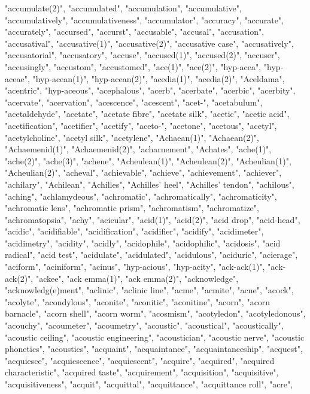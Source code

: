 "accumulate(2)",
"accumulated",
"accumulation",
"accumulative",
"accumulatively",
"accumulativeness",
"accumulator",
"accuracy",
"accurate",
"accurately",
"accursed",
"accurst",
"accusable",
"accusal",
"accusation",
"accusatival",
"accusative(1)",
"accusative(2)",
"accusative case",
"accusatively",
"accusatorial",
"accusatory",
"accuse",
"accused(1)",
"accused(2)",
"accuser",
"accusingly",
"accustom",
"accustomed",
"ace(1)",
"ace(2)",
"hyp-acea",
"hyp-aceae",
"hyp-acean(1)",
"hyp-acean(2)",
"acedia(1)",
"acedia(2)",
"Aceldama",
"acentric",
"hyp-aceous",
"acephalous",
"acerb",
"acerbate",
"acerbic",
"acerbity",
"acervate",
"acervation",
"acescence",
"acescent",
"acet-",
"acetabulum",
"acetaldehyde",
"acetate",
"acetate fibre",
"acetate silk",
"acetic",
"acetic acid",
"acetification",
"acetifier",
"acetify",
"aceto-",
"acetone",
"acetous",
"acetyl",
"acetylcholine",
"acetyl silk",
"acetylene",
"Achaean(1)",
"Achaean(2)",
"Achaemenid(1)",
"Achaemenid(2)",
"acharnement",
"Achates",
"ache(1)",
"ache(2)",
"ache(3)",
"achene",
"Acheulean(1)",
"Acheulean(2)",
"Acheulian(1)",
"Acheulian(2)",
"acheval",
"achievable",
"achieve",
"achievement",
"achiever",
"achilary",
"Achilean",
"Achilles",
"Achilles' heel",
"Achilles' tendon",
"achilous",
"aching",
"achlamydeous",
"achromatic",
"achromatically",
"achromaticity",
"achromatic lens",
"achromatic prism",
"achromatism",
"achromatize",
"achromatopsia",
"achy",
"acicular",
"acid(1)",
"acid(2)",
"acid drop",
"acid-head",
"acidic",
"acidifiable",
"acidification",
"acidifier",
"acidify",
"acidimeter",
"acidimetry",
"acidity",
"acidly",
"acidophile",
"acidophilic",
"acidosis",
"acid radical",
"acid test",
"acidulate",
"acidulated",
"acidulous",
"aciduric",
"acierage",
"aciform",
"aciniform",
"acinus",
"hyp-acious",
"hyp-acity",
"ack-ack(1)",
"ack-ack(2)",
"ackee",
"ack emma(1)",
"ack emma(2)",
"acknowledge",
"acknowledg(e)ment",
"aclinic",
"aclinic line",
"acme",
"acmite",
"acne",
"acock",
"acolyte",
"acondylous",
"aconite",
"aconitic",
"aconitine",
"acorn",
"acorn barnacle",
"acorn shell",
"acorn worm",
"acosmism",
"acotyledon",
"acotyledonous",
"acouchy",
"acoumeter",
"acoumetry",
"acoustic",
"acoustical",
"acoustically",
"acoustic ceiling",
"acoustic engineering",
"acoustician",
"acoustic nerve",
"acoustic phonetics",
"acoustics",
"acquaint",
"acquaintance",
"acquaintanceship",
"acquest",
"acquiesce",
"acquiescence",
"acquiescent",
"acquire",
"acquired",
"acquired characteristic",
"acquired taste",
"acquirement",
"acquisition",
"acquisitive",
"acquisitiveness",
"acquit",
"acquittal",
"acquittance",
"acquittance roll",
"acre",
